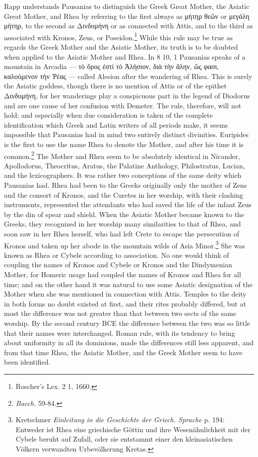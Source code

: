 \documentclass[a4paper, 11pt, oneside, polutonikogreek, french]{article}
\begin{document}
Rapp understands Pausanias to distinguish the Greek Great Mother, the Asiatic Great Mother, and Rhea by referring to the first always as μήτηρ θεῶν or μεγάλη μήτηρ, to the second as Δινδυμήνη or as connected with Attis, and to the third as associated with Kronos, Zeus, or Poseidon.\footnote{Roscher's Lex. 2 1, 1660.} While this rule may be true as regards the Greek Mother and the Asiatic Mother, its truth is to be doubted when applied to the Asiatic Mother and Rhea. In 8 10, 1 Pausanias speaks of a mountain in Arcadia --- τὸ ὄρος ἐστὶ τὸ Ἀλήσιον, διὰ τὴν ἄλην, ὥς φασι, καλούμενον τὴν Ῥέας --- called Alesion after the wandering of Rhea. This is surely the Asiatic goddess, though there is no mention of Attis or of the epithet Δινδυμήνη, for her wanderings play a conspicuous part in the legend of Diodorus and are one cause of her confusion with Demeter. The rule, therefore, will not hold; and especially when due consideration is taken of the complete identification which Greek and Latin writers of all periods make, it seems impossible that Pausanias had in mind two entirely distinct divinities. Euripides is the first to use the name Rhea to denote the Mother, and after his time it is common.\footnote{\emph{Bacch.} 59-84.} The Mother and Rhea seem to be absolutely identical in Nicander, Apollodorus, Theocritus, Aratus, the Palatine Anthology, Philostratus, Lucian, and the lexicographers. It was rather two conceptions of the same deity which Pausanias had. Rhea had been to the Greeks originally only the mother of Zens and the consort of Kronos, and the Curetes in her worship, with their clashing instruments, represented the attendants who had saved the life of the infant Zeus by the din of spear and shield. When the Asiatic Mother became known to the Greeks, they recognized in her worship many similarities to that of Rhea, and soon saw in her Rhea herself, who had left Crete to escape the persecution of Kronos and taken up her abode in the mountain wilds of Asia Minor.\footnote{Kretschmer \emph{Einleitung in die Geschichte der Griech. Sprache} p. 194: Entweder ist Rhea eine griechische Göttin und ihre Wesenähnlichkeit mit der Cybele beruht auf Zufall, oder sie entstammt einer den kleinasiatischen Völkern verwandten Urbevölkerung Kretas.} She was known as Rhea or Cybele according to association. No one would think of coupling the names of Kronos and Cybele or Kronos and the Dindymenian Mother, for Homeric usage had coupled the names of Kronos and Rhea for all time; and on the other hand it was natural to use some Asiatic designation of the Mother when she was mentioned in connection with Attis. Temples to the deity in both forms no doubt existed at first, and their rites probably differed, but at most the difference was not greater than that between two sects of the same worship. By the second century \textsc{BCE} the difference between the two was so little that their names were interchanged. Roman rule, with its tendency to bring about uniformity in all its dominions, made the differences still less apparent, and from that time Rhea, the Asiatic Mother, and the Greek Mother seem to have been identified.
\clearpage
\end{document}
